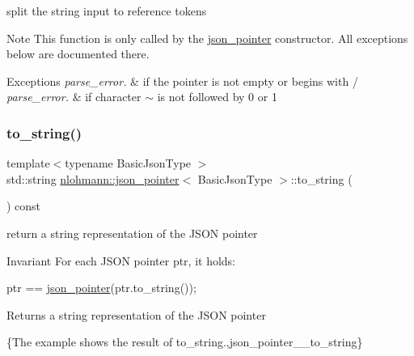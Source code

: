 split the string input to reference tokens 

\begin{DoxyNote}{Note}
This function is only called by the \hyperlink{classnlohmann_1_1json__pointer}{json\+\_\+pointer} constructor. All exceptions below are documented there.
\end{DoxyNote}

\begin{DoxyExceptions}{Exceptions}
{\em parse\+\_\+error.} & if the pointer is not empty or begins with \textquotesingle{}/\textquotesingle{} \\
\hline
{\em parse\+\_\+error.} & if character \textquotesingle{}$\sim$\textquotesingle{} is not followed by \textquotesingle{}0\textquotesingle{} or \textquotesingle{}1\textquotesingle{} \\
\hline
\end{DoxyExceptions}
\mbox{\label{classnlohmann_1_1json__pointer_a3d4b15d32d096e3776c5d2c773b524f5}} 
\subsubsection{\texorpdfstring{to\+\_\+string()}{to\_string()}}
{\footnotesize\ttfamily template$<$typename Basic\+Json\+Type $>$ \\
std\+::string \hyperlink{classnlohmann_1_1json__pointer}{nlohmann\+::json\+\_\+pointer}$<$ Basic\+Json\+Type $>$\+::to\+\_\+string (\begin{DoxyParamCaption}{ }\end{DoxyParamCaption}) const\hspace{0.3cm}{\ttfamily [inline]}}



return a string representation of the J\+S\+ON pointer 

\begin{DoxyInvariant}{Invariant}
For each J\+S\+ON pointer {\ttfamily ptr}, it holds\+: 
\begin{DoxyCode}
ptr == \hyperlink{classnlohmann_1_1json__pointer_a7f32d7c62841f0c4a6784cf741a6e4f8}{json\_pointer}(ptr.to\_string());
\end{DoxyCode}

\end{DoxyInvariant}
\begin{DoxyReturn}{Returns}
a string representation of the J\+S\+ON pointer
\end{DoxyReturn}
\{The example shows the result of {\ttfamily to\+\_\+string}.,json\+\_\+pointer\+\_\+\+\_\+to\+\_\+string\}

